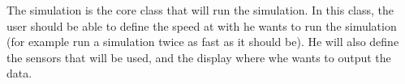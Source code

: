 
The simulation is the core class that will run the simulation. In this class, the user should be able to define the speed at with he wants to run the simulation (for example run a simulation twice as fast as it should be). He will also define the sensors that will be used, and the display where whe wants to output the data.

